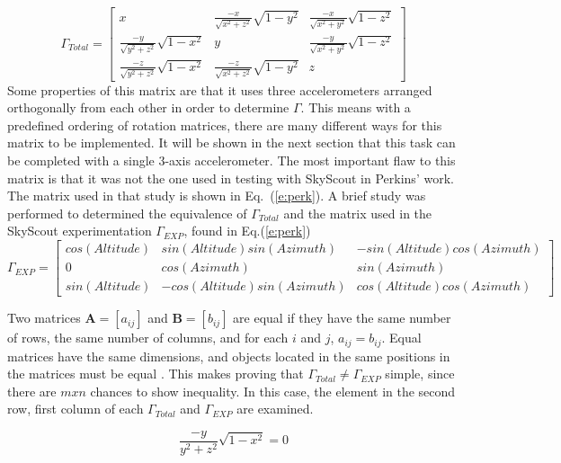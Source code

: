 \documentclass[12pt,a4paper]{book}
\begin{document}
\begin{equation}
\Gamma_{Total} = \begin{bmatrix}
x & \frac{-x}{\sqrt{x^{2} + z^{2}}}\sqrt{1-y^{2}} & \frac{-x}{\sqrt{x^{2} + y^{2}}}\sqrt{1-z^{2}} \\
\frac{-y}{\sqrt{y^{2} + z^{2}}}\sqrt{1-x^{2}} & y & \frac{-y}{\sqrt{x^{2} + y^{2}}}\sqrt{1-z^{2}} \\
\frac{-z}{\sqrt{y^{2} + z^{2}}}\sqrt{1-x^{2}} & \frac{-z}{\sqrt{x^{2} + z^{2}}}\sqrt{1-y^{2}} & z
\end{bmatrix}
\end{equation}
Some properties of this matrix are that it uses three accelerometers arranged orthogonally from each other in order to determine $\Gamma$.  This means with a predefined ordering of rotation matrices, there are many different ways for this matrix to be implemented. It will be shown in the next section that this task can be completed with a single 3-axis accelerometer.  The most important flaw to this matrix is that it was not the one used in testing with SkyScout in Perkins' work.  The matrix used in that study is shown in Eq.~(\ref{e:perk}). A brief study was performed to determined the equivalence of $\Gamma_{Total}$ and the matrix used in the SkyScout experimentation $\Gamma_{EXP}$, found in Eq.(\ref{e:perk})
\begin{equation}
\Gamma_{EXP} = 
\begin{bmatrix}
cos(Altitude) & sin(Altitude)sin(Azimuth) & -sin(Altitude)cos(Azimuth)\\
0 & cos(Azimuth) & sin(Azimuth)\\
sin(Altitude) & -cos(Altitude)sin(Azimuth) & cos(Altitude)cos(Azimuth)
\end{bmatrix}
\label{e:perk}
\end{equation}

Two matrices $\mathbf{A} = [a_{ij}]$ and $\mathbf{B} = [b_{ij}]$ are equal if they have the same number of rows, the same number of columns, and for each $i$ and $j$, $a_{ij}=b_{ij}$.  Equal matrices have the same dimensions, and objects located in the same positions in the matrices must be equal \cite{b:advanced}.  This makes proving that $\Gamma_{Total} \neq \Gamma_{EXP}$ simple, since there are $mxn$ chances to show inequality.  In this case, the element in the second row, first column of each $\Gamma_{Total}$ and $\Gamma_{EXP}$ are examined.

\begin{equation}
    \frac{-y}{y^{2} + z^{2}}\sqrt{1-x^{2}} = 0
    \label{e:inequal}
\end{equation}
\end{document}
